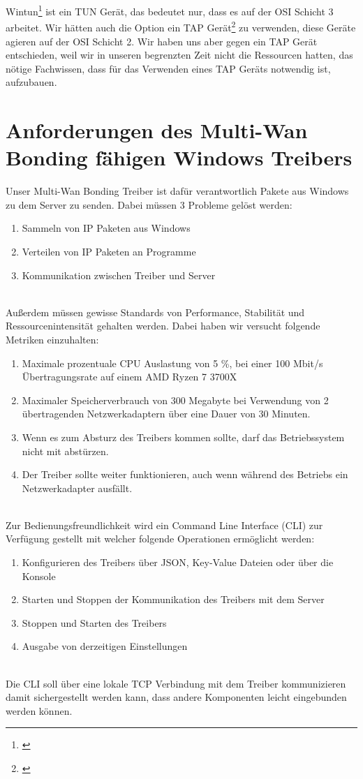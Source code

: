 \newpage

Wintun\footnote[1]{\cite[Vgl.][]{1}} ist ein TUN Gerät, das bedeutet nur, dass es auf der OSI Schicht 3 arbeitet. Wir hätten auch die Option ein TAP Gerät\footnote[1]{\cite[Vgl.][]{28}} zu verwenden, diese Geräte agieren auf der OSI Schicht 2. Wir haben uns aber gegen ein TAP Gerät entschieden, weil wir in unseren begrenzten Zeit nicht die Ressourcen hatten, das nötige Fachwissen, dass für das Verwenden eines TAP Geräts notwendig ist, aufzubauen.

\section{Anforderungen des Multi-Wan Bonding fähigen Windows Treibers}

Unser Multi-Wan Bonding Treiber ist dafür verantwortlich Pakete aus Windows zu dem Server zu senden. Dabei müssen 3 Probleme gelöst werden:
\\
\begin{enumerate}
    \item Sammeln von IP Paketen aus Windows
    \item Verteilen von IP Paketen an Programme
    \item Kommunikation zwischen Treiber und Server
\end{enumerate}
\ \\
Außerdem müssen gewisse Standards von Performance, Stabilität und Ressourcenintensität gehalten werden. Dabei haben wir versucht folgende Metriken einzuhalten:
\\
\begin{enumerate}
    \item Maximale prozentuale CPU Auslastung von 5 \%, bei einer 100 Mbit/s Übertragungsrate auf einem AMD Ryzen 7 3700X
    \item Maximaler Speicherverbrauch von 300 Megabyte bei Verwendung von 2 übertragenden Netzwerkadaptern über eine Dauer von 30 Minuten.
    \item Wenn es zum Absturz des Treibers kommen sollte, darf das Betriebssystem nicht mit abstürzen.
    \item Der Treiber sollte weiter funktionieren, auch wenn während des Betriebs ein Netzwerkadapter ausfällt.
\end{enumerate}
\ \\
Zur Bedienungsfreundlichkeit wird ein Command Line Interface (CLI)  zur Verfügung gestellt mit welcher folgende Operationen ermöglicht werden:
\\
\begin{enumerate}
    \item Konfigurieren des Treibers über JSON, Key-Value Dateien oder über die Konsole
    \item Starten und Stoppen der Kommunikation des Treibers mit dem Server
    \item Stoppen und Starten des Treibers
    \item Ausgabe von derzeitigen Einstellungen
\end{enumerate}
\ \\
Die CLI soll über eine lokale TCP Verbindung mit dem Treiber kommunizieren damit sichergestellt werden kann, dass andere Komponenten leicht eingebunden werden können.

